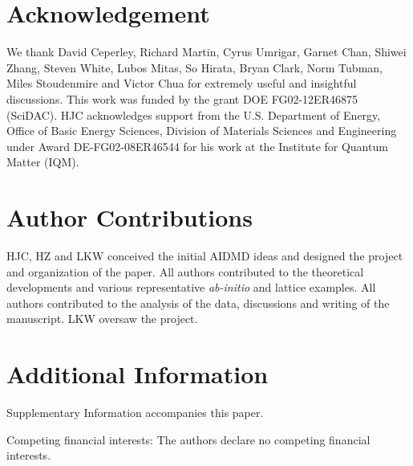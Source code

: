 \section{Acknowledgement} 
We thank  David Ceperley,  Richard Martin, Cyrus Umrigar,  Garnet Chan,  Shiwei Zhang, Steven White,  
Lubos Mitas, So Hirata, Bryan Clark, Norm Tubman, Miles Stoudenmire and Victor Chua for extremely useful and insightful discussions. 
This work was funded by the grant DOE FG02-12ER46875 (SciDAC). HJC acknowledges support from the U.S. Department of Energy, 
Office of Basic Energy Sciences, Division of Materials Sciences and Engineering under Award DE-FG02-08ER46544 for his work at the Institute for Quantum Matter (IQM). 

\section*{Author Contributions}
HJC, HZ and LKW conceived the initial AIDMD ideas and designed the project and organization of the paper. 
All authors contributed to the theoretical developments and various representative \textit{ab-initio} and lattice examples. 
All authors contributed to the analysis of the data, discussions and writing of the manuscript. 
LKW oversaw the project. 
 
\section*{Additional Information}
Supplementary Information accompanies this paper.

Competing financial interests: The authors declare no competing financial interests.


